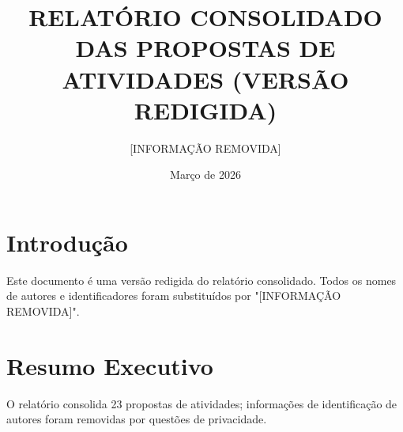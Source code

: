 \documentclass[12pt,a4paper]{article}
\begin{document}
\title{RELATÓRIO CONSOLIDADO DAS PROPOSTAS DE ATIVIDADES (VERSÃO REDIGIDA)}
\author{[INFORMAÇÃO REMOVIDA]}
\date{Março de 2026}
\maketitle

\section*{Introdução}
Este documento é uma versão redigida do relatório consolidado. Todos os nomes de autores e identificadores foram substituídos por "[INFORMAÇÃO REMOVIDA]".

\section*{Resumo Executivo}
O relatório consolida 23 propostas de atividades; informações de identificação de autores foram removidas por questões de privacidade.

\end{document}
